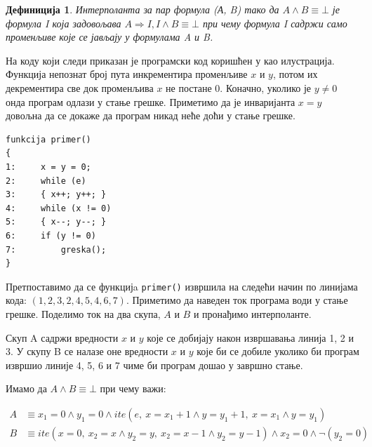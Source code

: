 \documentclass[a4paper]{article}
\newtheorem{definic}{Дефиниција}
\begin{document}
{\begin{definic}
Интерполанта за пар формула (А, B) тако да $A \land B \equiv \bot$ је формула I која задовољава $A \Rightarrow I, I \land B \equiv \bot$
при чему формула I садржи само променљиве које се јављају у формулама A и B.
\end{definic}

На коду који следи приказан је програмски код коришћен у \cite{Sharma_interpolantsas} као илустрација.
Функција непознат број пута инкрементира променљиве $x$ и $y$, потом их декрементира све док променљива $x$
не постане 0. Коначно, уколико је $y \neq 0$ онда програм одлази у стање грешке.
Приметимо да је инваријанта $x = y$ довољна да се докаже да програм никад неће доћи у стање грешке.

\begin{verbatim}
funkcija primer()
{
1:     x = y = 0;
2:     while (e)
3:     { x++; y++; }
4:     while (x != 0)
5:     { x--; y--; }
6:     if (y != 0)
7:         greska();
}
\end{verbatim}


Претпоставимо да се функцијa \texttt{primer()} извршила на следећи начин по линијама кода: $(1, 2, 3, 2, 4, 5, 4, 6, 7)$. Приметимо
да наведен ток програма води у стање грешке. Поделимо ток на два скупа, $A$ и $B$ и пронађимо интерполанте.

Скуп A садржи вредности $x$ и $y$ које се добијају након извршавања линија 1, 2 и 3. У скупу B се налазе оне вредности $x$ и $y$
које би се добиле уколико би програм извршио линије 4, 5, 6 и 7 чиме би програм дошао у завршно стање.

Имамо да $A \land B \equiv \bot$ при чему важи:

\begin{equation*}
\begin{split}
    A & \equiv x_1 = 0 \land y_1 = 0 \land ite(e,\ x = x_1 + 1 \land y = y_1 + 1, \ x = x_1 \land y = y_1)     \\
    B & \equiv ite(x = 0,\ x_2 = x \land y_2 = y,\ x_2 = x - 1 \land y_2 = y-1) \land x_2 = 0 \land \neg (y_2 = 0)
\end{split}
\end{equation*}

}
\end{document}
